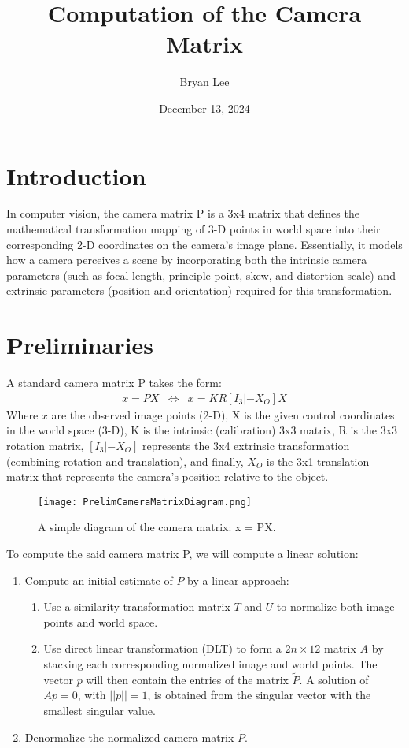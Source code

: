 \documentclass[12pt]{article}
\title{Computation of the Camera Matrix}
\author{Bryan Lee}
\date{December 13, 2024}
\begin{document}
\maketitle

\section{Introduction}
In computer vision, the camera matrix P is a 3x4 matrix that defines the mathematical transformation mapping of 3-D points in world space into their corresponding 2-D coordinates on the camera's image plane. Essentially, it models how a camera perceives a scene by incorporating both the intrinsic camera parameters (such as focal length, principle point, skew, and distortion scale) and extrinsic parameters (position and orientation) required for this transformation.

\section{Preliminaries}
A standard camera matrix P takes the form:
\[
	\begin{array}{rrcl}
        x = PX & \Leftrightarrow & x = KR[I_3 | -X_O]X
	\end{array}
\]
Where \( x \) are the observed image points (2-D), X is the given control coordinates in the world space (3-D), K is the intrinsic (calibration) 3x3 matrix, R is the 3x3 rotation matrix, \( [I_3 | -X_O] \) represents the 3x4 extrinsic transformation (combining rotation and translation), and finally, \( X_O \) is the 3x1 translation matrix that represents the camera's position relative to the object.\\

\begin{figure}[ht]
    \centering
    \texttt{[image: PrelimCameraMatrixDiagram.png]}
    \caption{A simple diagram of the camera matrix: x = PX.}
\end{figure}

\noindent To compute the said camera matrix P, we will compute a linear solution:
\begin{enumerate}
    \item Compute an initial estimate of \( P \) by a linear approach: \begin{enumerate}
        \item Use a similarity transformation matrix \( T \) and \( U \) to normalize both image points and world space.
        \item Use direct linear transformation (DLT) to form a \( 2n \times 12 \) matrix \( A \) by stacking each corresponding normalized image and world points. The vector \( p \) will then contain the entries of the matrix \( \tilde{P} \). A solution of \( Ap = 0 \), with \( ||p|| = 1 \), is obtained from the singular vector with the smallest singular value.
    \end{enumerate}

    \item Denormalize the normalized camera matrix \( \tilde{P} \).
\end{enumerate}
\end{document}
